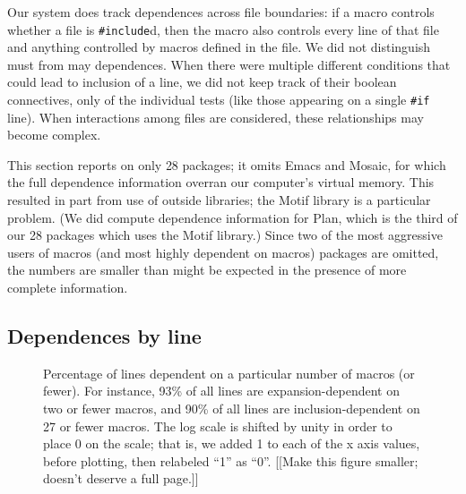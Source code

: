 \documentclass[10pt]{article}
\def\numpackageslesstwo{28}
\begin{document}
Our system does track dependences across file boundaries: if a macro
controls whether a file is {\tt \#include}d, then the macro also controls
every line of that file and anything controlled by macros defined in the
file.  We did not distinguish must from may dependences.  When there were
multiple different conditions that could lead to inclusion of a line, we
did not keep track of their boolean connectives, only of the individual
tests (like those appearing on a single {\tt \#if} line).  When
interactions among files are considered, these relationships may become
complex.



This section reports on only {\numpackageslesstwo} packages; it omits Emacs
and Mosaic, for which the full dependence information overran our
computer's virtual memory.  This resulted in part from use of outside
libraries; the Motif library is a particular problem.  (We did compute
dependence information for Plan, which is the third of our
{\numpackageslesstwo} packages which uses the Motif library.)  Since two of
the most aggressive users of macros (and most highly dependent on macros)
packages  are omitted, the numbers are smaller than might be expected in
the presence of more complete information.


\subsection{Dependences by line}

\begin{figure}
\centerline{}

\caption{Percentage of lines dependent on a particular number of macros (or
  fewer).  For instance, 93\% of all lines are expansion-dependent on two
  or fewer macros, and 90\% of all lines are inclusion-dependent on 27 or
  fewer macros.  The log scale is shifted by unity in order to place 0
  on the scale; that is, we added 1 to each of the x axis values, before
  plotting, then relabeled ``1'' as ``0''.
  [[Make this figure smaller; doesn't deserve a full page.]]}
\label{fig:dep-byline}
\end{figure}
\end{document}
